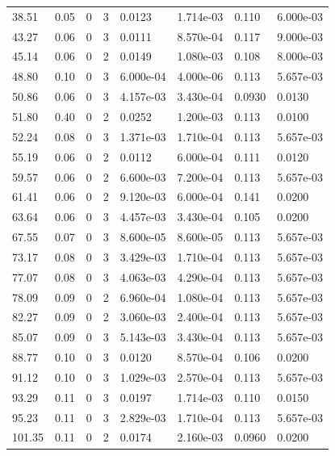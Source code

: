 \documentclass[preview]{standalone}
\begin{document}
{{\begin{tabular}{L{1.2cm}C{1.2cm} C{0.3cm}C{0.5cm} C{1.4cm}C{1.4cm} C{1.4cm}C{1.4cm}}
  38.51  &  0.05  & 0     &  3 &  0.0123  & 1.714e-03  & 0.110 &  6.000e-03   \\ 
  43.27  &  0.06  & 0     &  3 &  0.0111  & 8.570e-04  & 0.117 &  9.000e-03   \\ 
  45.14  &  0.06  & 0     &  2 &  0.0149  & 1.080e-03  & 0.108 &  8.000e-03   \\ 
  48.80  &  0.10  & 0     &  3 &  6.000e-04  & 4.000e-06  & 0.113 &  5.657e-03   \\ 
  50.86  &  0.06  & 0     &  3 &  4.157e-03  & 3.430e-04  & 0.0930 &  0.0130   \\ 
  51.80  &  0.40  & 0     &  2 &  0.0252  & 1.200e-03  & 0.113 &  0.0100   \\ 
  52.24  &  0.08  & 0     &  3 &  1.371e-03  & 1.710e-04  & 0.113 &  5.657e-03   \\ 
  55.19  &  0.06  & 0     &  2 &  0.0112  & 6.000e-04  & 0.111 &  0.0120   \\ 
  59.57  &  0.06  & 0     &  2 &  6.600e-03  & 7.200e-04  & 0.113 &  5.657e-03   \\ 
  61.41  &  0.06  & 0     &  2 &  9.120e-03  & 6.000e-04  & 0.141 &  0.0200   \\ 
  63.64  &  0.06  & 0     &  3 &  4.457e-03  & 3.430e-04  & 0.105 &  0.0200   \\ 
  67.55  &  0.07  & 0     &  3 &  8.600e-05  & 8.600e-05  & 0.113 &  5.657e-03   \\ 
  73.17  &  0.08  & 0     &  3 &  3.429e-03  & 1.710e-04  & 0.113 &  5.657e-03   \\ 
  77.07  &  0.08  & 0     &  3 &  4.063e-03  & 4.290e-04  & 0.113 &  5.657e-03   \\ 
  78.09  &  0.09  & 0     &  2 &  6.960e-04  & 1.080e-04  & 0.113 &  5.657e-03   \\ 
  82.27  &  0.09  & 0     &  2 &  3.060e-03  & 2.400e-04  & 0.113 &  5.657e-03   \\ 
  85.07  &  0.09  & 0     &  3 &  5.143e-03  & 3.430e-04  & 0.113 &  5.657e-03   \\ 
  88.77  &  0.10  & 0     &  3 &  0.0120  & 8.570e-04  & 0.106 &  0.0200   \\ 
  91.12  &  0.10  & 0     &  3 &  1.029e-03  & 2.570e-04  & 0.113 &  5.657e-03   \\ 
  93.29  &  0.11  & 0     &  3 &  0.0197  & 1.714e-03  & 0.110 &  0.0150   \\ 
  95.23  &  0.11  & 0     &  3 &  2.829e-03  & 1.710e-04  & 0.113 &  5.657e-03   \\ 
  101.35  &  0.11  & 0     &  2 &  0.0174  & 2.160e-03  & 0.0960 &  0.0200   \\ 

\end{tabular}}}
\end{document}
